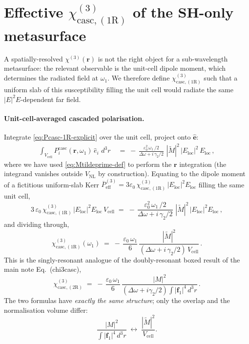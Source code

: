\documentclass[11pt,a4paper]{article}
\newcommand{\eps}{\varepsilon}
\newcommand{\bvec}[1]{\mathbf{#1}}
\newcommand{\f}{\bvec{f}}
\newcommand{\ri}{\bvec{r}}
\newcommand{\dthreer}{\,d^{3}r}
\newcommand{\chithree}{\chi^{(3)}}
\newcommand{\Dom}{\Delta\omega}
\newcommand{\chicascOneR}{\chi^{(3)}_{\text{casc},(1\mathrm R)}}
\newcommand{\chicascTwoR}{\chi^{(3)}_{\text{casc},(2\mathrm R)}}
\newcommand{\Vunit}{V_{\text{cell}}}
\newcommand{\VNL}{V_{\text{NL}}}
\begin{document}
\section{Effective \texorpdfstring{$\chicascOneR$}{χ³\_casc^(1R)} of the SH-only metasurface}\label{sec:chi3-1R}

A spatially-resolved $\chithree(\ri)$ is not the right object for a
sub-wavelength metasurface: the relevant observable is the unit-cell dipole
moment, which determines the radiated field at $\omega_1$.  We therefore
define $\chicascOneR$ such that a uniform slab of
this susceptibility filling the unit cell would radiate the same
$|E|^{2}E$-dependent far field.

\paragraph{Unit-cell-averaged cascaded polarisation.}
Integrate \eqref{eq:Pcasc-1R-explicit} over the unit cell, project onto
$\hat{\bm e}$:
\begin{align}
  \int_{\Vunit}\!P_i^{\text{casc}}(\ri,\omega_1)\,\hat e_i\,\dthreer
   &\;=\;
   -\,\frac{\eps_0^{2}\,\omega_1\,/2}{\Dom+i\,\gamma_2/2}\,
      \,|\widetilde M|^{2}\,|E_\text{loc}|^{2}\,E_\text{loc}\,,
   \label{eq:Pcasc-1R-integrated}
\end{align}
where we have used \eqref{eq:Mtildeprime-def} to perform the $\ri$
integration (the integrand vanishes outside $\VNL$ by construction).
Equating to the dipole moment of a fictitious uniform-slab Kerr
$\overline P^{(3)}_\text{eff}=3\eps_0\,\chicascOneR\,
|E_\text{loc}|^{2}E_\text{loc}$
filling the same unit cell,
\begin{equation}
  3\,\eps_0\,\chicascOneR\,|E_\text{loc}|^{2}E_\text{loc}\,\Vunit
   \;=\;-\,\frac{\eps_0^{2}\,\omega_1\,/2}{\Dom+i\,\gamma_2/2}\,
            \,|\widetilde M|^{2}\,|E_\text{loc}|^{2}E_\text{loc}\,,
\end{equation}
and dividing through,
\begin{equation}
  \boxed{\;\chicascOneR(\omega_1)
            \;=\;-\,\frac{\eps_0\,\omega_1}{6}\,
              \frac{|\widetilde M|^{2}}{(\Dom+i\,\gamma_2/2)\,\Vunit}\,.\;}
  \label{eq:chi3-1R-boxed}
\end{equation}
This is the singly-resonant analogue of the doubly-resonant boxed result
of the main note Eq.~(chi3casc),
\begin{equation*}
  \chicascTwoR\;=\;-\,\frac{\eps_0\,\omega_1}{6}\,
       \frac{|M|^{2}}{(\Dom+i\gamma_2/2)\!\int\!|\f_1|^{4}\dthreer}\,.
\end{equation*}
The two formulas have \emph{exactly the same structure}; only the overlap
and the normalisation volume differ:
\begin{equation}
  \frac{|M|^{2}}{\int|\f_1|^{4}\dthreer}
  \;\longleftrightarrow\;
  \frac{|\widetilde M|^{2}}{\Vunit}.
  \label{eq:swap-rule}
\end{equation}
\end{document}
